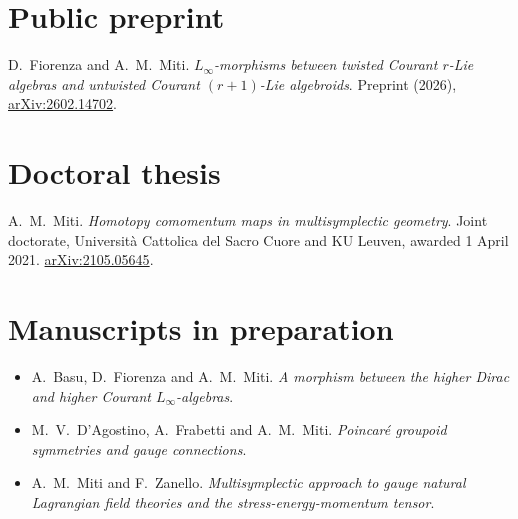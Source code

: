 \documentclass[11pt,a4paper]{article}
\begin{document}
\section*{Public preprint}
D.~Fiorenza and A.~M.~Miti. \emph{$L_\infty$-morphisms between twisted Courant $r$-Lie algebras and untwisted Courant $(r+1)$-Lie algebroids}. Preprint (2026), \href{https://arxiv.org/abs/2602.14702}{arXiv:2602.14702}.
\section*{Doctoral thesis}
A.~M.~Miti. \emph{Homotopy comomentum maps in multisymplectic geometry}. Joint doctorate, Universit\`a Cattolica del Sacro Cuore and KU Leuven, awarded 1 April 2021. \href{https://arxiv.org/abs/2105.05645}{arXiv:2105.05645}.
\section*{Manuscripts in preparation}
\begin{itemize}
\item A.~Basu, D.~Fiorenza and A.~M.~Miti. \emph{A morphism between the higher Dirac and higher Courant $L_\infty$-algebras}.
\item M.~V.~D'Agostino, A.~Frabetti and A.~M.~Miti. \emph{Poincar\'e groupoid symmetries and gauge connections}.
\item A.~M.~Miti and F.~Zanello. \emph{Multisymplectic approach to gauge natural Lagrangian field theories and the stress-energy-momentum tensor}.
\end{itemize}
\end{document}

